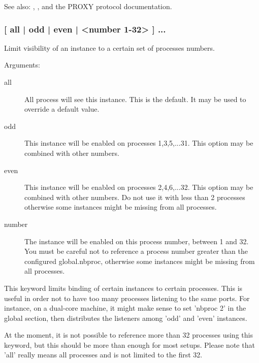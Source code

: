   See also: , ,  and the PROXY protocol
             documentation.

\subsubsection[bind-process]{ [ all | odd | even | <number 1-32> ] ...}

  Limit visibility of an instance to a certain set of processes numbers.
  
                                 
  Arguments:
  \begin{description}
  \item[all]   All process will see this instance. This is the default. It
                  may be used to override a default value.

  \item[odd]   This instance will be enabled on processes 1,3,5,...31. This
                  option may be combined with other numbers.

  \item[even]  This instance will be enabled on processes 2,4,6,...32. This
                  option may be combined with other numbers. Do not use it
                  with less than 2 processes otherwise some instances might be
                  missing from all processes.

  \item[number] The instance will be enabled on this process number, between
                  1 and 32. You must be careful not to reference a process
                  number greater than the configured global.nbproc, otherwise
                  some instances might be missing from all processes.
  \end{description}

  This keyword limits binding of certain instances to certain processes. This
  is useful in order not to have too many processes listening to the same
  ports. For instance, on a dual-core machine, it might make sense to set
  'nbproc 2' in the global section, then distributes the listeners among 'odd'
  and 'even' instances.

  At the moment, it is not possible to reference more than 32 processes using
  this keyword, but this should be more than enough for most setups. Please
  note that 'all' really means all processes and is not limited to the first
  32.

